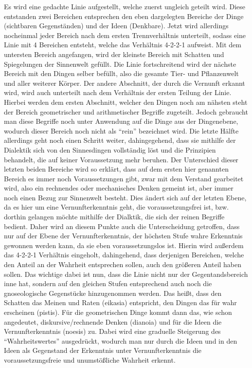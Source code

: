 Es wird eine gedachte Linie aufgestellt, welche zuerst ungleich geteilt wird. Diese entstanden zwei Bereichen entsprechen den  eben dargelegten Bereiche der Dinge (sichtbaren Gegenständen) und der Ideen (Denkbare). Jetzt wird allerdings nocheinmal jeder Bereich nach dem ersten Trennverhältnis unterteilt, sodass eine Linie mit 4 Bereichen entsteht, welche das Verhältnis 4-2-2-1 aufweist. Mit dem untersten Bereich angefangen, wird der kleinste Bereich mit Schatten und Spiegelungen der Sinnenwelt gefüllt. Die Linie fortschreitend wird der nächste Bereich mit den Dingen selber befüllt, also die gesamte Tier- und Pflanzenwelt und aller weiterer Körper. Der andere Abschnitt, der durch die Vernunft erkannt wird, wird auch unterteilt nach dem Verhältnis der ersten Teilung der Linie. Hierbei werden dem ersten Abschnitt, welcher den Dingen noch am nähsten steht der Bereich geometrischer und arithmetischer Begriffe zugeteilt. Jedoch gebraucht man diese Begriffe noch unter Anwendung auf die Dinge aus der Dingenebene, wodurch dieser Bereich noch nicht als \enquote{rein} bezeichnet wird. Die letzte Hälfte allerdings geht noch einen Schritt weiter, dahingegehend, dass sie mithilfe der Dialektik sich von den Sinnesdingen vollständig löst und die Prinzipien behandelt, die auf keiner Voraussetzung mehr beruhen. Der Unterschied dieser letzten beiden Bereiche wird so erklärt, dass auf dem ersten hier genannten Bereich es immer noch Voraussetzungen gibt, zwar mit dem Verstand gearbeitet wird, also ein rechnendes oder mechanisches Denken gemeint ist, aber immer noch einen Bezug zur Sinnenwelt besteht. Dies ändert sich auf der letzten Ebene, da es hier um eine Vernunfterkenntnis geht, die voraussetzungsfrei ist, bzw. dorthin gelangen möchte mithilfe der Dialktik, die sich der reinen Begriffe bedient. 
Daher wird an diesem Punkte auch die Unterscheidung getroffen, dass nur auf der Ebene der Vernunfterkenntnis, der höchsten Stufe wahre Erkenntnis gewonnen werden kann, da sie eben voraussetzungslos ist. Hierin wird außerdem das 4-2-2-1 Verhältnis eingeholt, dahingehend, dass derjenigen Bereichen, welche den Anteil an der Wahrheit entsprechen sollen, auch den größeren Anteil haben sollen.
Das wichtige dabei ist nun, dass die Linie nicht nur der Gegentandsbereich inne hat, sondern auf den gleichen Stufen entsprechend auch noch die gnoseologische Gegenstücke hinzugenommen werden. Das heißt, dass den Schatten das Meinen und Raten (eikasia) entspricht, den Dingen das für wahr erscheinen (pistis). Für die geometrischen Dinge kommt dann das, wie schon angedeutet, diskursive/rechnende Denken (dianoia) und für die Ideen die Vernunfterkenntnis (noesis) zu. Dabei wird eine graduelle Steigerung des \enquote{Wahrheitswertes} ausgedrückt, wodurch man nur durch die Ideen und in den Ideen als Gegenstand der Erkenntnis unter Vernunfterkenntnis die voraussetzungsfreie und unumstößliche Wahrheit erkennt. 
